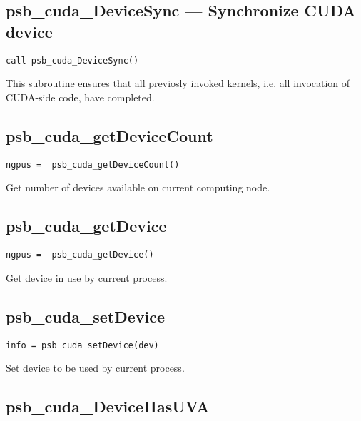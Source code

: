 \subsection*{psb\_cuda\_DeviceSync ---  Synchronize CUDA device}

\begin{verbatim}
call psb_cuda_DeviceSync()
\end{verbatim}

This subroutine ensures that all previosly invoked kernels, i.e. all
invocation of CUDA-side code, have completed.


\subsection*{psb\_cuda\_getDeviceCount }

\begin{verbatim}
ngpus =  psb_cuda_getDeviceCount()
\end{verbatim}

Get number of devices available on current computing node. 

\subsection*{psb\_cuda\_getDevice }

\begin{verbatim}
ngpus =  psb_cuda_getDevice()
\end{verbatim}

Get  device in use by current process. 

\subsection*{psb\_cuda\_setDevice }

\begin{verbatim}
info = psb_cuda_setDevice(dev)
\end{verbatim}

Set  device to be used  by current process. 

\subsection*{psb\_cuda\_DeviceHasUVA }

